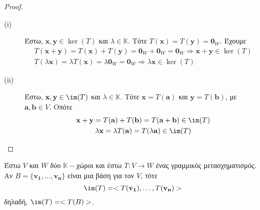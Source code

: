 \begin{proof}
\item {}
  \begin{description}
    \item [(i)] 
      Έστω, $ \mathbf{x}, \mathbf{y} \in \ker(T) $ και $ \lambda \in \mathbb{K} $. 
      Τότε $ T(\mathbf{x}) = T(\mathbf{y}) = \mathbf{0}_{W} $. 
      Έχουμε
      \begin{gather*}
        T(\mathbf{x}+ \mathbf{y}) = T(\mathbf{x}) + T(\mathbf{y}) = 
        \mathbf{0}_{W} + \mathbf{0}_{W} = \mathbf{0}_{W} \Rightarrow 
        \mathbf{x}+ \mathbf{y} \in \ker(T) \\
        T(\lambda \mathbf{x}) = \lambda T(\mathbf{x}) = \lambda \mathbf{0}_{W} = 
        \mathbf{0}_{W} \Rightarrow \lambda \mathbf{x} \in \ker(T) 
      \end{gather*}
    \item [(ii)] 
      Έστω, $ \mathbf{x}, \mathbf{y} \in \im(T) $ και $ \lambda \in \mathbb{K} $. 
      Τότε $ \mathbf{x} = T(\mathbf{a}) $ και $ \mathbf{y} = T(\mathbf{b}) $, με 
      $ \mathbf{a}, \mathbf{b} \in V $. Οπότε
      \begin{gather*}
        \mathbf{x} + \mathbf{y} = T(\mathbf{a}) + T(\mathbf{b}) = T(\mathbf{a}+
        \mathbf{b}) \in \im(T) \\
        \lambda \mathbf{x} = \lambda T(\mathbf{a}) = T(\lambda \mathbf{a}) \in \im(T)
      \end{gather*}
  \end{description}
\end{proof}

\begin{thm}\label{thm:imt}
  Έστω $V$ και $W$ δύο $ \mathbb{K}- $χώροι και έστω $ T \colon V \to W $ ένας 
  γραμμικός μετασχηματισμός. Αν $ B = \{ \mathbf{v_{1}}, \ldots, \mathbf{v_{n}} \} $ 
  είναι μια βάση για τον $V$, τότε
  \[
    \im(T) = < T(\mathbf{v_{1}}), \ldots, T(\mathbf{v_{n}}) >  
  \]
  δηλαδή, $ \im(T) = < T(B) > $.
\end{thm}

